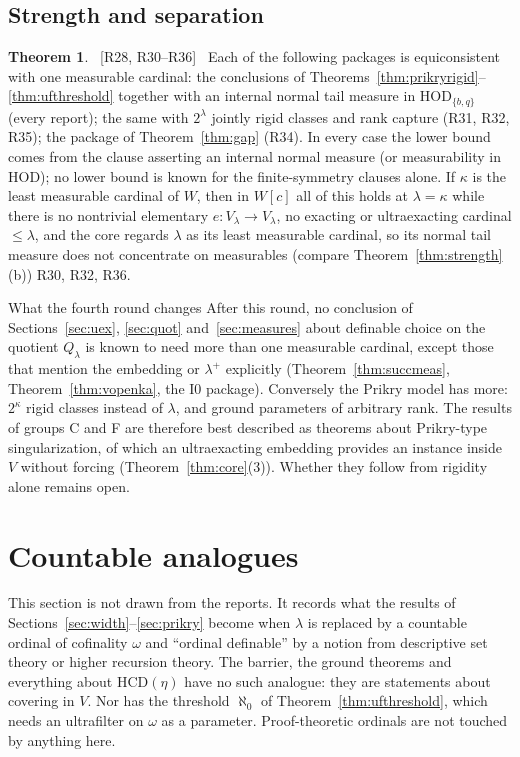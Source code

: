 \documentclass[11pt,letterpaper]{article}
\theoremstyle{definition}
\newtheorem{theorem}[definition]{Theorem}
\numberwithin{equation}{section}
\newcommand{\HOD}{\mathrm{HOD}}
\newcommand{\HCD}{\mathrm{HCD}}
\newcommand{\Izero}{\mathrm{I0}}
\newcommand{\src}[1]{\unskip\ {\normalfont\small\sffamily\color{Olive}[#1]}\ }
\newcommand{\R}[1]{\textsf{R#1}}
\begin{document}
\subsection{Strength and separation}

\begin{theorem}\label{thm:prikrystrength}\src{R28, R30--R36}
Each of the following packages is equiconsistent with one measurable cardinal: the conclusions of Theorems~\ref{thm:prikryrigid}--\ref{thm:ufthreshold} together with an internal normal tail measure in $\HOD_{\{b,q\}}$ (every report); the same with $2^\lambda$ jointly rigid classes and rank capture (\R{31}, \R{32}, \R{35}); the package of Theorem~\ref{thm:gap} (\R{34}). In every case the lower bound comes from the clause asserting an internal normal measure (or measurability in $\HOD$); no lower bound is known for the finite-symmetry clauses alone.
If $\kappa$ is the least measurable cardinal of $W$, then in $W[c]$ all of this holds at $\lambda=\kappa$ while there is no nontrivial elementary $e:V_\lambda\to V_\lambda$, no exacting or ultraexacting cardinal $\le\lambda$, and the core regards $\lambda$ as its least measurable cardinal, so its normal tail measure does not concentrate on measurables (compare Theorem~\ref{thm:strength}(b)) \R{30}, \R{32}, \R{36}.
\end{theorem}

\begin{assessment}{What the fourth round changes}
After this round, no conclusion of Sections~\ref{sec:uex}, \ref{sec:quot} and~\ref{sec:measures} about definable choice on the quotient $Q_\lambda$ is known to need more than one measurable cardinal, except those that mention the embedding or $\lambda^+$ explicitly (Theorem~\ref{thm:succmeas}, Theorem~\ref{thm:vopenka}, the $\Izero$ package). Conversely the Prikry model has more: $2^\kappa$ rigid classes instead of $\lambda$, and ground parameters of arbitrary rank. The results of groups C and F are therefore best described as theorems about Prikry-type singularization, of which an ultraexacting embedding provides an instance inside $V$ without forcing (Theorem~\ref{thm:core}(3)). Whether they follow from rigidity alone remains open.
\end{assessment}

\section{Countable analogues}\label{sec:countable}

This section is not drawn from the reports. It records what the results of Sections~\ref{sec:width}--\ref{sec:prikry} become when $\lambda$ is replaced by a countable ordinal of cofinality $\omega$ and ``ordinal definable'' by a notion from descriptive set theory or higher recursion theory. The barrier, the ground theorems and everything about $\HCD(\eta)$ have no such analogue: they are statements about covering in $V$. Nor has the threshold $\aleph_0$ of Theorem~\ref{thm:ufthreshold}, which needs an ultrafilter on $\omega$ as a parameter. Proof-theoretic ordinals are not touched by anything here.
\end{document}
